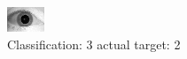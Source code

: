 \begin{figure}[h!]
\begin{center}
\includegraphics[width=0.60\columnwidth]{figures/ID1689_class_3_target_2.png}
\end{center}
\caption{ Classification: 3 actual target: 2}
\label{fig:ID1689_class_3_target_2}
\end{figure}
